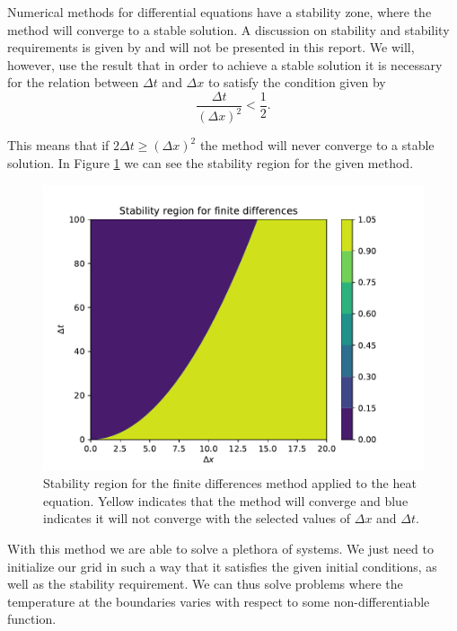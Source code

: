 \documentclass[aps,reprint,superscriptaddress,nofootinbib]{revtex4-2}
\begin{document}
    Numerical methods for differential equations have a stability zone, where the method will converge to a stable solution. A discussion on stability and stability requirements is given by \cite{winther} and will not be presented in this report. We will, however, use the result that in order to achieve a stable solution it is necessary for the relation between $\Delta t$ and $\Delta x$ to satisfy the condition given by
    \begin{equation} \label{eq:stab}
        \frac{\Delta t}{(\Delta x)^2} < \frac{1}{2}.
    \end{equation}
    
    This means that if \(2\Delta t \geq (\Delta x)^2\) the method will never converge to a stable solution. In Figure \ref{fig:stab_reg} we can see the stability region for the given method. 
    \begin{figure}
        \centering
        \includegraphics[scale=0.45]{figs/stability_region.pdf}
        \caption{Stability region for the finite differences method applied to the heat equation. Yellow indicates that the method will converge and blue indicates it will not converge with the selected values of \(\Delta x\) and \(\Delta t\).}
        \label{fig:stab_reg}
    \end{figure}
    
    With this method we are able to solve a plethora of systems. We just need to initialize our grid in such a way that it satisfies the given initial  conditions, as well as the stability requirement. We can thus solve problems where the temperature at the boundaries varies with respect to some non-differentiable function.
    
\end{document}
